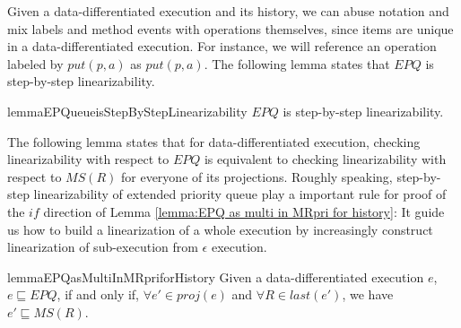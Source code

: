 Given a data-differentiated execution and its history, we can abuse notation and mix labels and method events with operations themselves, since items are unique in a data-differentiated execution. For instance, we will reference an operation labeled by $\textit{put}(p,a)$ as $\textit{put}(p,a)$. The following lemma states that $\textit{EPQ}$ is step-by-step linearizability.

\begin{restatable}{lemma}{EPQueueisStepByStepLinearizability}
\label{lemma:EPQ is step-by-step linearizability}
$\textit{EPQ}$ is step-by-step linearizability.
\end{restatable}

The following lemma states that for data-differentiated execution, checking linearizability with respect to $\textit{EPQ}$ is equivalent to checking linearizability with respect to $\textit{MS}(R)$ for everyone of its projections. Roughly speaking, step-by-step linearizability of extended priority queue play a important rule for proof of the $\textit{if}$ direction of Lemma \ref{lemma:EPQ as multi in MRpri for history}: It guide us how to build a linearization of a whole execution by increasingly construct linearization of sub-execution from $\epsilon$ execution.

\begin{restatable}{lemma}{EPQasMultiInMRpriforHistory}
\label{lemma:EPQ as multi in MRpri for history}
Given a data-differentiated execution $e$, $e \sqsubseteq \textit{EPQ}$, if and only if, $\forall e' \in \textit{proj}(e)$ and $\forall R \in \textit{last}(e')$, we have $e' \sqsubseteq \textit{MS}(R)$.
\end{restatable}
